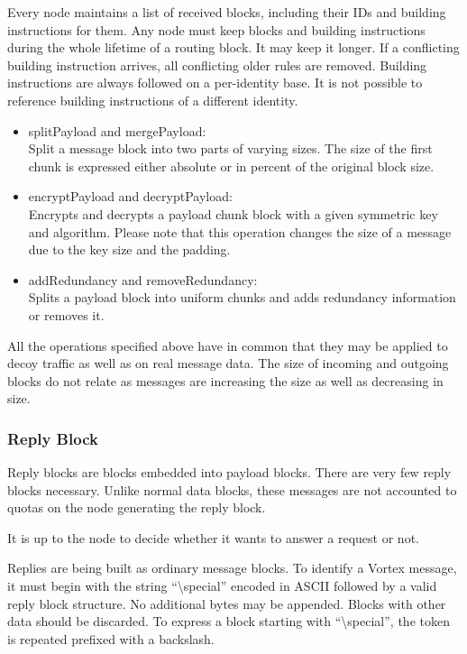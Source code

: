 Every node maintains a list of received blocks, including their IDs and building instructions for them. Any node must keep blocks and building instructions during the whole lifetime of a routing block. It may keep it longer. If a conflicting building instruction arrives, all conflicting older rules are removed. Building instructions are always followed on a per-identity base. It is not possible to reference building instructions of a different identity.

\begin{itemize}
	\item splitPayload and mergePayload: \\
	Split a message block into two parts of varying sizes. The size of the first chunk is expressed either absolute or in percent of the original block size.
	\item encryptPayload and decryptPayload:\\ 
	Encrypts and decrypts a payload chunk block with a given symmetric key and algorithm. Please note that this operation changes the size of a message due to the key size and the padding.
	\item addRedundancy and removeRedundancy:\\
	Splits a payload block into uniform chunks and adds redundancy information or removes it.
\end{itemize}
All the operations specified above have in common that they may be applied to decoy traffic as well as on real message data. The size of incoming and outgoing blocks do not relate as messages are increasing the size as well as decreasing in size.

\subsubsection{Reply Block\label{sec:replyBlock}}
Reply blocks are blocks embedded into payload blocks. There are very few reply blocks necessary. Unlike normal data blocks, these messages are not accounted to quotas on the node generating the reply block. 

It is up to the node to decide whether it wants to answer a request or not.

Replies are being built as ordinary message blocks. To identify a Vortex message, it must begin with the string ``\textbackslash special'' encoded in ASCII followed by a valid reply block structure. No additional bytes may be appended. Blocks with other data should be discarded. To express a block starting with ``\textbackslash special'', the token is repeated prefixed with a backslash.

